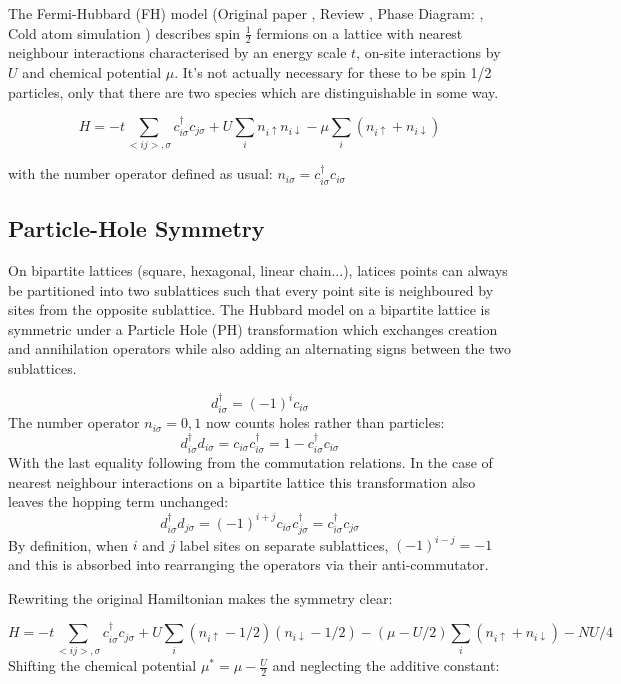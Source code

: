 \documentclass[a4paper, 11pt, onecolumn]{article}
\begin{document}
The Fermi-Hubbard (FH) model (Original paper \cite{hubbard_j._electron_1963}, Review \cite{manousakis_spin-textonehalf_1991}, Phase Diagram: \cite{esslinger_fermi-hubbard_2010}, Cold atom simulation \cite{mazurenko_cold-atom_2017}) describes spin $\frac{1}{2}$ fermions on a lattice with nearest neighbour interactions characterised by an energy scale $t$, on-site interactions by $U$ and chemical potential $\mu$. It's not actually necessary for these to be spin 1/2 particles, only that there are two species which are distinguishable in some way.

$$ H = -t \sum_{<ij>,\sigma} c^\dag_{i\sigma}c_{j\sigma} + U \sum_{i} n_{i \uparrow} n_{i\downarrow} - \mu \sum_i \left( n_{i \uparrow} + n_{i \downarrow} \right)$$

with the number operator defined as usual: $n_{i \sigma} = c^\dag_{i\sigma}  c_{i\sigma}$

\subsection{Particle-Hole Symmetry}
On bipartite lattices (square, hexagonal, linear chain...), latices points can always be partitioned into two sublattices such that every point site is neighboured by sites from the opposite sublattice. The Hubbard model on a bipartite lattice is symmetric under a Particle Hole (PH) transformation which exchanges creation and annihilation operators while also adding an alternating signs between the two sublattices.

$$ d^\dag_{i\sigma} = (-1)^i c_{i\sigma}$$
The number operator $n_{i\sigma} = 0,1$ now counts holes rather than particles:
$$ d^\dag_{i\sigma} d_{i \sigma} = c_{i\sigma} c^\dag_{i\sigma} = 1 - c^\dag_{i\sigma} c_{i\sigma}$$
With the last equality following from the commutation relations. In the case of nearest neighbour interactions on a bipartite lattice this transformation also leaves the hopping term unchanged:
$$ d^\dag_{i\sigma} d_{j \sigma} = (-1)^{i+j} c_{i\sigma} c^\dag_{j\sigma} = c^\dag_{i\sigma} c_{j\sigma}$$
By definition, when $i$ and $j$ label sites on separate sublattices, $(-1)^{i-j} = -1$ and this is absorbed into rearranging the operators via their anti-commutator.

Rewriting the original Hamiltonian makes the symmetry clear:

$$ H = -t \sum_{<ij>,\sigma} c^\dag_{i\sigma}c_{j\sigma} + U \sum_{i} (n_{i \uparrow} - 1/2)( n_{i\downarrow} - 1/2) - (\mu - U/2) \sum_i \left( n_{i \uparrow} + n_{i \downarrow} \right) - N U/4$$
Shifting the chemical potential $\mu^* = \mu - \frac{U}{2}$ and neglecting the additive constant:
\end{document}
